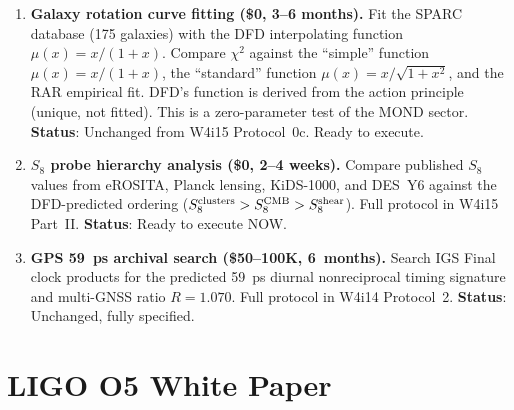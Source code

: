 \documentclass[11pt]{article}
\begin{document}
\begin{enumerate}

\item \textbf{Galaxy rotation curve fitting (\$0, 3--6 months).}
  Fit the SPARC database (175 galaxies) with the DFD interpolating
  function $\mu(x) = x/(1+x)$. Compare $\chi^2$ against the ``simple''
  function $\mu(x) = x/(1+x)$, the ``standard'' function
  $\mu(x) = x/\sqrt{1+x^2}$, and the RAR empirical fit. DFD's
  function is derived from the action principle (unique, not fitted).
  This is a zero-parameter test of the MOND sector.
  \textbf{Status}: Unchanged from W4i15 Protocol~0c. Ready to execute.

\item \textbf{$S_8$ probe hierarchy analysis (\$0, 2--4 weeks).}
  Compare published $S_8$ values from eROSITA, Planck lensing,
  KiDS-1000, and DES~Y6 against the DFD-predicted ordering
  ($S_8^{\rm clusters} > S_8^{\rm CMB} > S_8^{\rm shear}$).
  Full protocol in W4i15 Part~II. \textbf{Status}: Ready
  to execute NOW.

\item \textbf{GPS 59~ps archival search (\$50--100K, 6~months).}
  Search IGS Final clock products for the predicted 59~ps diurnal
  nonreciprocal timing signature and multi-GNSS ratio $R = 1.070$.
  Full protocol in W4i14 Protocol~2. \textbf{Status}: Unchanged,
  fully specified.

\end{enumerate}


\part{LIGO O5 White Paper}
\label{part:ligo}
\end{document}
